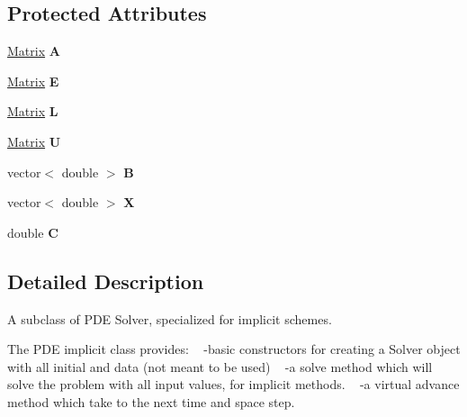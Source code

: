 \subsection*{Protected Attributes}
\begin{DoxyCompactItemize}
\item 
\mbox{\label{class_p_d_e_implicit_a43137099658d7cfa6d40f0c5d526c50b}} 
\hyperlink{class_matrix}{Matrix} {\bfseries A}
\item 
\mbox{\label{class_p_d_e_implicit_a067558d8aa140e0826c66a890a05b63b}} 
\hyperlink{class_matrix}{Matrix} {\bfseries E}
\item 
\mbox{\label{class_p_d_e_implicit_a3cf6ba9c1ae64074e79328d3ecfe1f7d}} 
\hyperlink{class_matrix}{Matrix} {\bfseries L}
\item 
\mbox{\label{class_p_d_e_implicit_a3c1dabd8717d8c560fa69d6838952351}} 
\hyperlink{class_matrix}{Matrix} {\bfseries U}
\item 
\mbox{\label{class_p_d_e_implicit_a787825cb4daaca9b90787e612e8aa5fa}} 
vector$<$ double $>$ {\bfseries B}
\item 
\mbox{\label{class_p_d_e_implicit_a5f6932af52db54b561af048bad266d52}} 
vector$<$ double $>$ {\bfseries X}
\item 
\mbox{\label{class_p_d_e_implicit_a977f4b0e57f031fb7e1a0dd13445822d}} 
double {\bfseries C}
\end{DoxyCompactItemize}


\subsection{Detailed Description}
A subclass of P\+DE Solver, specialized for implicit schemes.

The P\+DE implicit class provides\+: ~\newline
-\/basic constructors for creating a Solver object with all initial  and data (not meant to be used) ~\newline
-\/a solve method which will solve the problem with all input values,  for implicit methods. ~\newline
-\/a virtual advance method which take to the next time and space step. 

